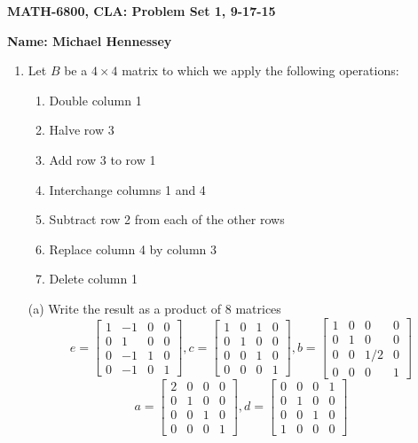 \documentclass[12pt]{article}
\numberwithin{equation}{section}
\begin{document}
{\large\bf MATH-6800, CLA: Problem Set 1, 9-17-15}



\vspace{6 ex}

{\bf Name: Michael Hennessey} \hfill

\vspace{6 ex}

\begin{enumerate}
\item Let $B$ be a $4\times 4$ matrix to which we apply the following operations:
    \begin{enumerate}
    \item Double column 1
    \item Halve row 3
    \item Add row 3 to row 1
    \item Interchange columns 1 and 4
    \item Subtract row 2 from each of the other rows
    \item Replace column 4 by column 3
    \item Delete column 1
    \end{enumerate}
    (a) Write the result as a product of 8 matrices\\
    $$e=\left[\begin{array}{cccc}1&-1&0&0\\0&1&0&0\\0&-1&1&0\\0&-1&0&1\end{array}\right],c=\left[\begin{array}{cccc}1&0&1&0\\0&1&0&0\\0&0&1&0\\0&0&0&1\end{array}\right],b=\left[\begin{array}{cccc}1&0&0&0\\0&1&0&0\\0&0&1/2&0\\0&0&0&1\end{array}\right]$$
    $$a=\left[\begin{array}{cccc}2&0&0&0\\0&1&0&0\\0&0&1&0\\0&0&0&1\end{array}\right],d=\left[\begin{array}{cccc}0&0&0&1\\0&1&0&0\\0&0&1&0\\1&0&0&0\end{array}\right]
$$
\end{enumerate}
\end{document}
